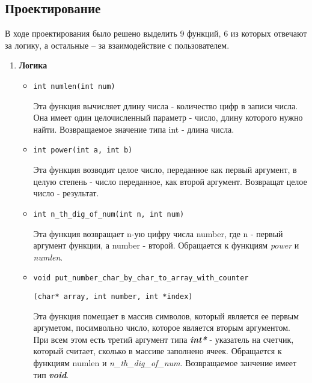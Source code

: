 \documentclass[12pt,a4paper]{report}
\begin{document}
\subsection{Проектирование}
\hspace{\parindent}
В ходе проектирования было решено выделить 9 функций, 6 из которых отвечают за логику, а остальные -- за взаимодействие с пользователем.
\begin{enumerate}
\item \textbf{Логика}
\begin{itemize}
\item \verb-int numlen(int num)-

Эта функция вычисляет длину числа - количество цифр в записи числа. Она имеет один целочисленный параметр - число, длину которого нужно найти. Возвращаемое значение типа int - длина числа.
\end{itemize}

\begin{itemize}
\item \verb-int power(int a, int b)-

Эта функция возводит целое число, переданное как первый аргумент, в целую степень - число переданное, как второй аргумент. Возвращат целое число - результат.
\end{itemize}

\begin{itemize}
\item \verb-int n_th_dig_of_num(int n, int num)-

Эта функция возвращает n-ую цифру числа number, где n - первый аргумент функции, а number - второй. Обращается к функциям \textit{power} и \textit{numlen}.
\end{itemize}

\begin{itemize}
\item \verb-void put_number_char_by_char_to_array_with_counter-

\begin{flushright}
\verb-(char* array, int number, int *index)-
\end{flushright}

Эта функция помещает в массив символов, который является ее первым аргуметом, посимвольно число, которое является вторым аргументом. При всем этом есть третий аргумент типа \textit{\textbf{int*}} - указатель на счетчик, который считает, сколько в массиве заполнено ячеек. Обращается к функциям numlen и \textit{n\_th\_dig\_of\_num}. Возвращаемое занчение имеет тип \textbf{\textit{void}}.
\end{itemize}


\end{enumerate}
\end{document}
